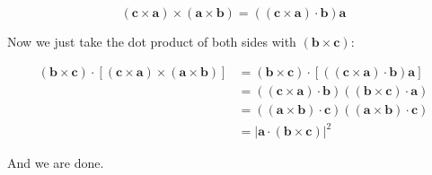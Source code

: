 \documentclass{article}
\begin{document}
$$(\mathbf c\times\mathbf a)\times(\mathbf a\times\mathbf b)=((\mathbf c\times\mathbf a)\cdot\mathbf b)\mathbf a$$

Now we just take the dot product of both sides with $(\mathbf b\times\mathbf c)$:

\begin{align*}
  (\mathbf b\times\mathbf c)\cdot[(\mathbf c\times\mathbf a)\times(\mathbf a\times\mathbf b)]&=(\mathbf b\times\mathbf c)\cdot[((\mathbf c\times\mathbf a)\cdot\mathbf b)\mathbf a]\\
  &=((\mathbf c\times\mathbf a)\cdot\mathbf b)((\mathbf b\times\mathbf c)\cdot\mathbf a)\tag{distribute}\\
  &=((\mathbf a\times\mathbf b)\cdot\mathbf c)((\mathbf a\times\mathbf b)\cdot\mathbf c)\tag{cyclic permutate}\\
  &=|\mathbf a\cdot(\mathbf b\times\mathbf c)|^2
\end{align*}

And we are done.
\end{document}
